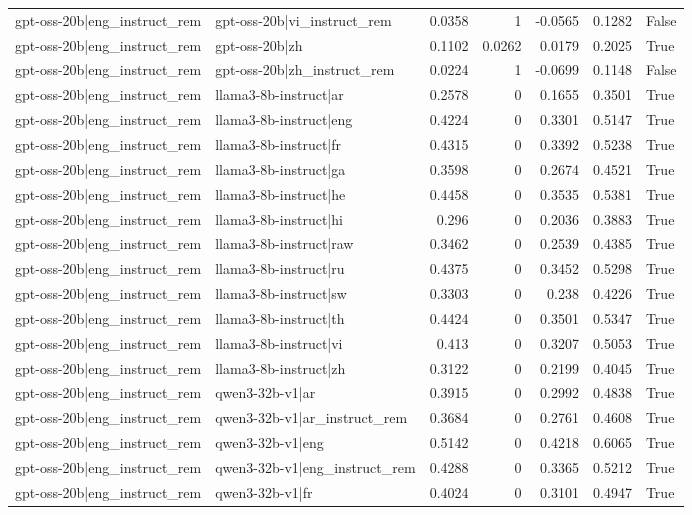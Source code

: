 \begin{table}
\begin{tabular}{l l r r r r l}
gpt-oss-20b|eng_instruct_rem & gpt-oss-20b|vi_instruct_rem & 0.0358 & 1 & -0.0565 & 0.1282 & False \\
gpt-oss-20b|eng_instruct_rem & gpt-oss-20b|zh & 0.1102 & 0.0262 & 0.0179 & 0.2025 & True \\
gpt-oss-20b|eng_instruct_rem & gpt-oss-20b|zh_instruct_rem & 0.0224 & 1 & -0.0699 & 0.1148 & False \\
gpt-oss-20b|eng_instruct_rem & llama3-8b-instruct|ar & 0.2578 & 0 & 0.1655 & 0.3501 & True \\
gpt-oss-20b|eng_instruct_rem & llama3-8b-instruct|eng & 0.4224 & 0 & 0.3301 & 0.5147 & True \\
gpt-oss-20b|eng_instruct_rem & llama3-8b-instruct|fr & 0.4315 & 0 & 0.3392 & 0.5238 & True \\
gpt-oss-20b|eng_instruct_rem & llama3-8b-instruct|ga & 0.3598 & 0 & 0.2674 & 0.4521 & True \\
gpt-oss-20b|eng_instruct_rem & llama3-8b-instruct|he & 0.4458 & 0 & 0.3535 & 0.5381 & True \\
gpt-oss-20b|eng_instruct_rem & llama3-8b-instruct|hi & 0.296 & 0 & 0.2036 & 0.3883 & True \\
gpt-oss-20b|eng_instruct_rem & llama3-8b-instruct|raw & 0.3462 & 0 & 0.2539 & 0.4385 & True \\
gpt-oss-20b|eng_instruct_rem & llama3-8b-instruct|ru & 0.4375 & 0 & 0.3452 & 0.5298 & True \\
gpt-oss-20b|eng_instruct_rem & llama3-8b-instruct|sw & 0.3303 & 0 & 0.238 & 0.4226 & True \\
gpt-oss-20b|eng_instruct_rem & llama3-8b-instruct|th & 0.4424 & 0 & 0.3501 & 0.5347 & True \\
gpt-oss-20b|eng_instruct_rem & llama3-8b-instruct|vi & 0.413 & 0 & 0.3207 & 0.5053 & True \\
gpt-oss-20b|eng_instruct_rem & llama3-8b-instruct|zh & 0.3122 & 0 & 0.2199 & 0.4045 & True \\
gpt-oss-20b|eng_instruct_rem & qwen3-32b-v1|ar & 0.3915 & 0 & 0.2992 & 0.4838 & True \\
gpt-oss-20b|eng_instruct_rem & qwen3-32b-v1|ar_instruct_rem & 0.3684 & 0 & 0.2761 & 0.4608 & True \\
gpt-oss-20b|eng_instruct_rem & qwen3-32b-v1|eng & 0.5142 & 0 & 0.4218 & 0.6065 & True \\
gpt-oss-20b|eng_instruct_rem & qwen3-32b-v1|eng_instruct_rem & 0.4288 & 0 & 0.3365 & 0.5212 & True \\
gpt-oss-20b|eng_instruct_rem & qwen3-32b-v1|fr & 0.4024 & 0 & 0.3101 & 0.4947 & True \\

\end{tabular}
\end{table}
